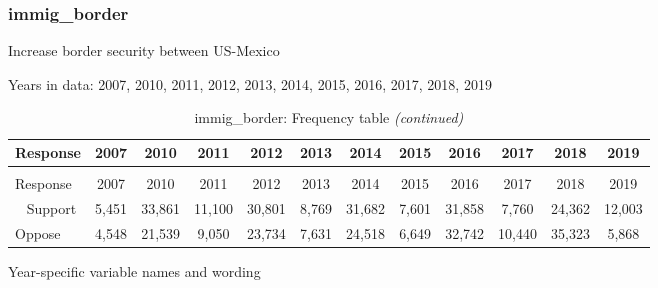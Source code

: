 \documentclass[12pt]{article}
\begin{document}
\subsubsection{immig\_border}\label{immig_border}

Increase border security between US-Mexico

Years in data: 2007, 2010, 2011, 2012, 2013, 2014, 2015, 2016, 2017,
2018, 2019\begingroup\fontsize{10}{12}\selectfont

\begin{longtable}[t]{lccccccccccc}
\caption{\label{tab:unnamed-chunk-4}immig\_border: Frequency table}\\
\toprule
Response & 2007 & 2010 & 2011 & 2012 & 2013 & 2014 & 2015 & 2016 & 2017 & 2018 & 2019\\
\midrule
\endfirsthead
\caption[]{immig\_border: Frequency table \textit{(continued)}}\\
\toprule
Response & 2007 & 2010 & 2011 & 2012 & 2013 & 2014 & 2015 & 2016 & 2017 & 2018 & 2019\\
\midrule
\endhead
\
\endfoot
\bottomrule
\endlastfoot
Support & 5,451 & 33,861 & 11,100 & 30,801 & 8,769 & 31,682 & 7,601 & 31,858 & 7,760 & 24,362 & 12,003\\
Oppose & 4,548 & 21,539 & 9,050 & 23,734 & 7,631 & 24,518 & 6,649 & 32,742 & 10,440 & 35,323 & 5,868\\*
\end{longtable}

\endgroup{}

Year-specific variable names and wording
\end{document}
